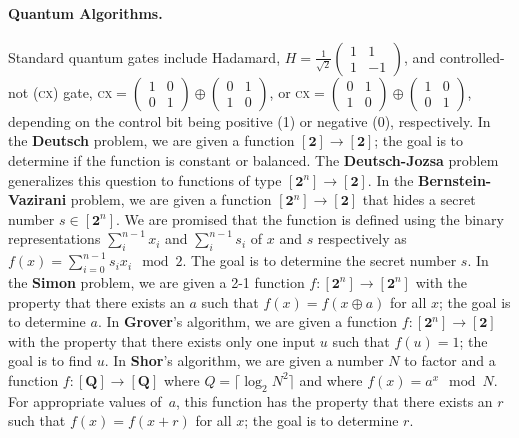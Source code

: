 \documentclass[aps,prl,twocolumn,superscriptaddress,floatfix,notitlepage]{revtex4-2}
\newcommand{\cx}{\textsc{cx}}
\newcommand{\finset}[1]{[\mathbf{#1}]}
\begin{document}
\paragraph*{Quantum Algorithms.}  
Standard quantum gates include Hadamard, $H=\frac{1}{\sqrt{2}}\begin{pmatrix}1& 1 \\ 1& -1 \end{pmatrix}$, 
and controlled-not (\cx) gate, \cx $=\begin{pmatrix}1& 0 \\ 0 & 1 \end{pmatrix}\oplus 
\begin{pmatrix}0& 1 \\ 1& 0 \end{pmatrix}$, or \cx $= 
\begin{pmatrix}0& 1 \\ 1& 0 \end{pmatrix}\oplus \begin{pmatrix}1& 0 \\ 0 & 1 \end{pmatrix}$, depending on 
the control bit being positive (1) or negative (0), respectively. 
In the \textbf{Deutsch} problem, we are given a function $\finset{2} \rightarrow \finset{2}$;
the goal is to determine if the function is constant or balanced.
The \textbf{Deutsch-Jozsa} problem generalizes this question to functions of type
$\finset{2^\mathit{n}} \rightarrow \finset{2}$.
In the \textbf{Bernstein-Vazirani} problem, we are given a function $\finset{2^\mathit{n}} \rightarrow \finset{2}$ 
that hides a secret number $s \in \finset{2^\mathit{n}}$. We are promised that the function is defined using the 
binary representations $\sum_i^{n-1} x_i$ and $\sum_i^{n-1} s_i$ of $x$ and $s$ respectively as 
$f(x) = \sum_{i=0}^{n-1} s_ix_i \mod{2}$. The goal is to determine the secret number $s$.
In the \textbf{Simon} problem, we are given a 2-1 function $f : \finset{2^\mathit{n}} \rightarrow \finset{2^\mathit{n}}$
with the property that there exists an $a$ such that $f(x) = f(x \oplus a)$ for all $x$; the goal is
to determine $a$. In \textbf{Grover}'s algorithm, we are given a function $f : \finset{2^\mathit{n}} \rightarrow \finset{2}$
with the property that there exists only one input $u$ such that $f(u) = 1$; the goal is to find $u$.
In \textbf{Shor}'s algorithm, we are given a number $N$ to factor and a
function $f : \finset{Q} \rightarrow \finset{Q}$ where $Q = \lceil \log_2 N^2 \rceil$ and where
$f(x) = a^x \mod{N}$. For appropriate values of~$a$, this function has the property that there exists an $r$ such 
that $f(x) = f(x+r)$ for all $x$; the goal is to determine $r$. 
\end{document}
